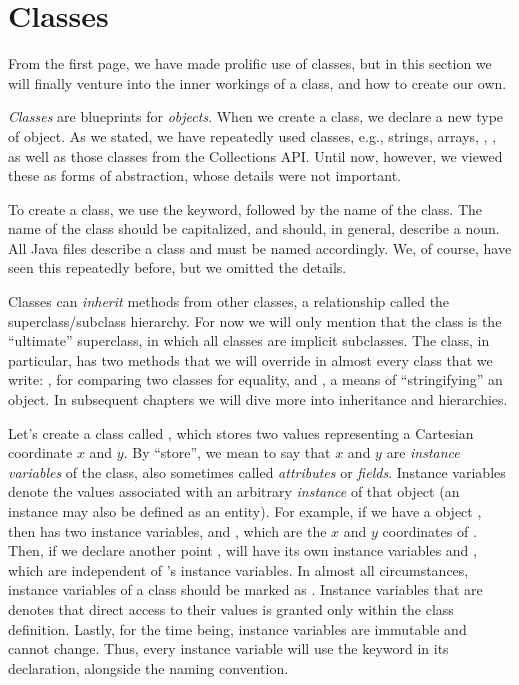 \section{Classes}
From the first page, we have made prolific use of classes, but in this section we will finally venture into the inner workings of a class, and how to create our own.

\textit{Classes} are blueprints for \textit{objects}. When we create a class, we declare a new type of object. As we stated, we have repeatedly used classes, e.g., strings, arrays, , , as well as those classes from the Collections API. Until now, however, we viewed these as forms of abstraction, whose details were not important. 

To create a class, we use the  keyword, followed by the name of the class. The name of the class should be capitalized, and should, in general, describe a noun. All Java files describe a class and must be named accordingly. We, of course, have seen this repeatedly before, but we omitted the details.

Classes can \textit{inherit} methods from other classes, a relationship called the superclass/subclass hierarchy. For now we will only mention that the  class is the ``ultimate'' superclass, in which all classes are implicit subclasses. The  class, in particular, has two methods that we will override in almost every class that we write: , for comparing two classes for equality, and , a means of ``stringifying'' an object. In subsequent chapters we will dive more into inheritance and hierarchies.

\example Let's create a class called , which stores two  values representing a Cartesian coordinate $x$ and $y$. By ``store'', we mean to say that $x$ and $y$ are \textit{instance variables} of the  class, also sometimes called \textit{attributes} or \textit{fields}. Instance variables denote the values associated with an arbitrary \textit{instance} of that object (an instance may also be defined as an entity). For example, if we have a  object , then  has two instance variables,  and , which are the $x$ and $y$ coordinates of . Then, if we declare another point ,  will have its own instance variables  and , which are independent of 's instance variables. In almost all circumstances, instance variables of a class should be marked as . Instance variables that are  denotes that direct access to their values is granted only within the class definition. Lastly, for the time being, instance variables are immutable and cannot change. Thus, every instance variable will use the  keyword in its declaration, alongside the  naming convention.

